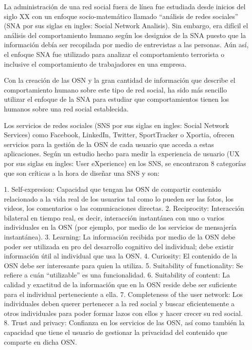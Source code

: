 La administración de una red social fuera de línea fue estudiada desde inicios del siglo XX\cite{dynamics} con un enfoque socio-matemático llamado “análisis de redes sociales” (SNA por sus siglas en ingles: Social Network Analisis). Sin embargo, era difícil el análisis del comportamiento humano según los designios de la SNA puesto que la información debía ser recopilada por medio de entrevistas a las personas. Aún así, el enfoque SNA fue utilizado para analizar el comportamiento terrorista o inclusive el comportamiento de trabajadores en una empresa.\cite{sna_startups}

Con la creación de las OSN y la gran cantidad de información que describe el comportamiento humano sobre este tipo de red social, ha sido más sencillo utilizar el enfoque de la SNA para estudiar que comportamientos tienen los humanos sobre una red social establecida.

Los servicios de redes sociales (SNS por sus siglas en ingles: Social Network Services) como Facebook, LinkedIn, Twitter, SportTracker o Xportia, ofrecen servicios para la gestión de la OSN de cada usuario que acceda a estas aplicaciones. Según un estudio hecho para medir la experiencia de usuario (UX por sus siglas en ingles: User eXperience) en los SNS, se encontraron 8 categorías que son críticas a la hora de diseñar una SNS y son:

1. Self-expresion: Capacidad que tengan las OSN de compartir contenido relacionado a la vida real de los usuarios tal como lo pueden ser las fotos, los videos, los comentarios o las comunicaciones directas.
2. Reciprocity: Interacción bilateral en tiempo real, es decir, interacción instantánea con uno o varios individuales en la OSN (por ejemplo, por medio de los servicios de mensajería instantánea).
3. Learning: La información recibida por medio de la OSN debe poder ser utilizada en pro del desarrollo cognitivo del individual; debe existir información útil al individual que usa la OSN.
4. Curiosity: El contenido de la OSN debe ser interesante para quien la utiliza.
5. Suitability of functionality: Se refiere a cuán “utilizable” es una funcionalidad.
6. Suitability of content: La calidad y exactitud de la información que en la OSN reside debe ser suficiente para el individual perteneciente a ella.
7. Completeness of the user network: Los individuales deben querer pertenecer a la red social y buscar eficientemente a otros individuales para poder formar lazos con ellos y hacer crecer su red social.
8. Trust and privacy: Confianza en los servicios de las OSN, así como también la capacidad que tiene el usuario de gestionar la privacidad del contenido que comparte en dicha OSN.\cite{social_experience}

